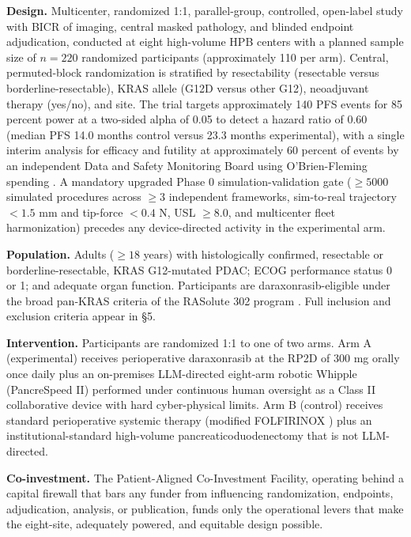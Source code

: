 \textbf{Design.} Multicenter, randomized 1:1, parallel-group, controlled,
open-label study with BICR of imaging, central masked pathology, and blinded
endpoint adjudication, conducted at eight high-volume HPB centers with a planned
sample size of $n=220$ randomized participants (approximately 110 per arm).
Central, permuted-block randomization is stratified by resectability (resectable
versus borderline-resectable), KRAS allele (G12D versus other G12), neoadjuvant
therapy (yes/no), and site. The trial targets approximately 140 PFS events for
85 percent power at a two-sided alpha of 0.05 to detect a hazard ratio of 0.60
(median PFS 14.0 months control versus 23.3 months experimental), with a single
interim analysis for efficacy and futility at approximately 60 percent of events
by an independent Data and Safety Monitoring Board using O'Brien-Fleming spending
\cite{DeMets1994lan}. A mandatory upgraded Phase 0 simulation-validation gate
($\geq 5000$ simulated procedures across $\geq 3$ independent frameworks, sim-to-real
trajectory $< 1.5$ mm and tip-force $< 0.4$ N, USL $\geq 8.0$, and multicenter
fleet harmonization) precedes any device-directed activity in the experimental
arm.

\textbf{Population.} Adults ($\geq 18$ years) with histologically confirmed,
resectable or borderline-resectable, KRAS G12-mutated PDAC; ECOG performance
status 0 or 1; and adequate organ function. Participants are daraxonrasib-eligible
under the broad pan-KRAS criteria of the RASolute 302 program
\cite{rasolute302}. Full inclusion and exclusion criteria appear in \S5.

\textbf{Intervention.} Participants are randomized 1:1 to one of two arms. Arm A
(experimental) receives perioperative daraxonrasib at the RP2D of 300 mg orally
once daily plus an on-premises LLM-directed eight-arm robotic Whipple
(PancreSpeed II) performed under continuous human oversight as a Class II
collaborative device with hard cyber-physical limits. Arm B (control) receives
standard perioperative systemic therapy (modified FOLFIRINOX \cite{Conroy2018})
plus an institutional-standard high-volume pancreaticoduodenectomy that is not
LLM-directed.

\textbf{Co-investment.} The Patient-Aligned Co-Investment Facility, operating
behind a capital firewall that bars any funder from influencing randomization,
endpoints, adjudication, analysis, or publication, funds only the operational
levers that make the eight-site, adequately powered, and equitable design
possible.

